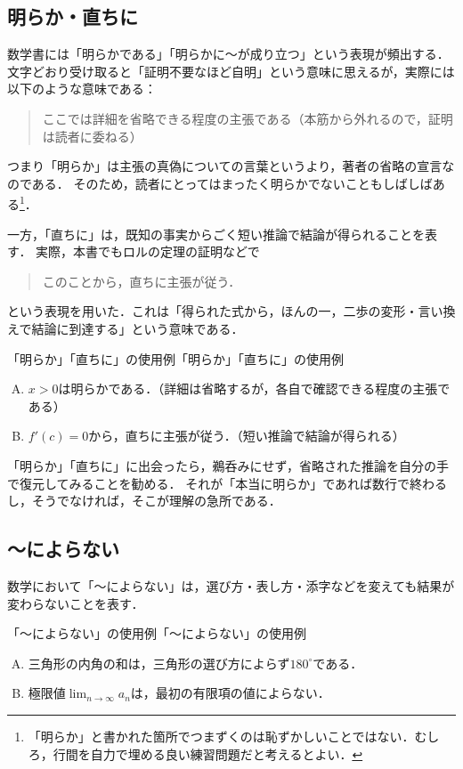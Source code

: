 \subsection{明らか・直ちに}

数学書には「明らかである」「明らかに〜が成り立つ」という表現が頻出する．
文字どおり受け取ると「証明不要なほど自明」という意味に思えるが，実際には以下のような意味である：

\begin{quote}
  ここでは詳細を省略できる程度の主張である（本筋から外れるので，証明は読者に委ねる）
\end{quote}
つまり「明らか」は主張の真偽についての言葉というより，著者の省略の宣言なのである．
そのため，読者にとってはまったく明らかでないこともしばしばある\footnote{「明らか」と書かれた箇所でつまずくのは恥ずかしいことではない．むしろ，行間を自力で埋める良い練習問題だと考えるとよい．}．

一方，「直ちに」は，既知の事実からごく短い推論で結論が得られることを表す．
実際，本書でもロルの定理の証明などで
\begin{quote}
  このことから，直ちに主張が従う．
\end{quote}
という表現を用いた．これは「得られた式から，ほんの一，二歩の変形・言い換えで結論に到達する」という意味である．

\begin{example}{「明らか」「直ちに」の使用例}{「明らか」「直ちに」の使用例}
  \begin{enumerate}[(A)]
    \item $x > 0$は明らかである．（詳細は省略するが，各自で確認できる程度の主張である）
    \item $f'(c)=0$から，直ちに主張が従う．（短い推論で結論が得られる）
  \end{enumerate}
\end{example}

「明らか」「直ちに」に出会ったら，鵜呑みにせず，省略された推論を自分の手で復元してみることを勧める．
それが「本当に明らか」であれば数行で終わるし，そうでなければ，そこが理解の急所である．

\subsection{〜によらない}

数学において「〜によらない」は，選び方・表し方・添字などを変えても結果が変わらないことを表す．

\begin{example}{「〜によらない」の使用例}{「〜によらない」の使用例}
  \begin{enumerate}[(A)]
    \item 三角形の内角の和は，三角形の選び方によらず$180^\circ$である．
    \item 極限値$\lim_{n \to \infty} a_n$は，最初の有限項の値によらない．
  \end{enumerate}
\end{example}

